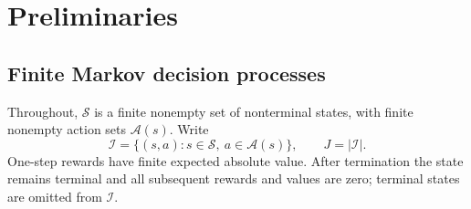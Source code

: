 \section{Preliminaries}
\label{sec: mcopi}


\subsection{Finite Markov decision processes}
Throughout, $\mathcal S$ is a finite nonempty set of nonterminal states, with finite nonempty action sets $\mathcal A(s)$. Write
\[
\mathcal I=\{(s,a):s\in\mathcal S,\ a\in\mathcal A(s)\},\qquad J=|\mathcal I|.
\]
One-step rewards have finite expected absolute value. After termination the state remains terminal and all subsequent rewards and values are zero; terminal states are omitted from $\mathcal I$.





